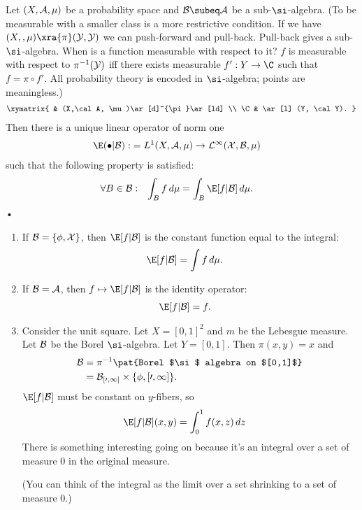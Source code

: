 \begin{df}
Let $(X,\cal A, \mu)$ be a probability space and $\cal B\subeq \cal A$ be a sub-$\si$-algebra. 
(To be measurable with a smaller class is a more restrictive condition. If we have $(X,\cal, \mu)\xra{\pi} (Y,\cal Y)$ we can push-forward and pull-back. Pull-back gives a sub-$\si$-algebra. When is a function measurable with respect to it? $f$ is measurable with respect to $\pi^{-1}(\cal Y)$ iff there exists measurable $f':Y\to \C$ such that $f =\pi \circ f'$. All probability theory is encoded in $\si$-algebra; points are meaningless.)
\begin{align}
\xymatrix{
& (X,\cal A, \mu)\ar[d]^{\pi}\ar[ld] \\
\C & \ar[l] (Y, \cal Y).
}
\end{align}
Then there is a unique linear operator of norm one
\begin{align}
\E (\bullet | \cal B) :&= L^1(X,\cal A, \mu) \to L^1(X, \cal B, \mu)
\end{align}
such that the following property is satisfied:
\begin{align}
\forall B&\in \cal B: & 
\int_B f\,d\mu &= \int_B \E[f|\cal B]\,d\mu.
\end{align}•
\end{df}
\begin{ex}
\begin{enumerate}
\item
If $\cal B=\{\phi,X\}$, then $\E[f|\cal B]$ is the constant function equal to the integral:
\begin{align}
\E[f|\cal B] &= \int f\,d\mu.
\end{align}
\item
If $\cal B=\cal A$, then $f\mapsto \E[f|\cal B]$ is the identity operator:
\begin{align}
\E[f|\cal B]&=f.
\end{align}
\item
Consider the unit square. Let $X=[0,1]^2$ and $m$ be the Lebesgue measure. Let $\cal B$ be the Borel $\si$-algebra. Let $Y=[0,1]$. 
Then $\pi(x,y) = x$ and 
\begin{align}
\cal B &= \pi^{-1}\pat{Borel $\si$ algebra on $[0,1]$}\\
&= \cal B_{[0,1]} \times \{\phi,[0,1]\}.
\end{align}
$\E[f|\cal B]$ must be constant on $y$-fibers, so
\begin{align}
\E[f|\cal B] (x,y) &= \int_0^1 f(x,z)\,dz
\end{align}
There is something interesting going on because it's an integral over a set of measure 0 in the original measure.

(You can think of the integral as the limit over a set shrinking to a set of measure 0.)
\end{enumerate}
\end{ex}


